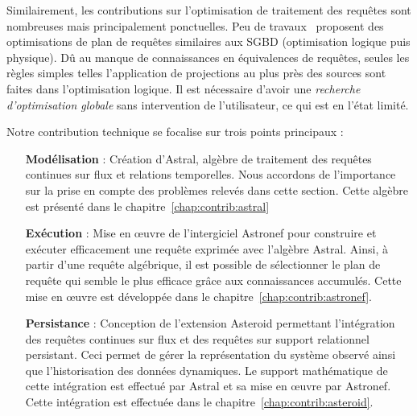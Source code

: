 Similairement, les contributions sur l'optimisation de traitement des requêtes sont nombreuses mais principalement ponctuelles. Peu de travaux~\cite{Galpin:snee,Kramer:semantics} proposent des optimisations de plan de requêtes similaires aux SGBD (optimisation logique puis physique). Dû au manque de connaissances en équivalences de requêtes, seules les règles simples telles l'application de projections au plus près des sources sont faites dans l'optimisation logique. Il est nécessaire d'avoir une \textit{recherche d'optimisation globale} sans intervention de l'utilisateur, ce qui est en l'état limité. 

Notre contribution technique se focalise sur trois points principaux :
\begin{itemize}
 \item[\textbf{Modélisation}] : Création d'Astral, algèbre de traitement des requêtes continues sur flux et relations temporelles. Nous accordons de l'importance sur la prise en compte des problèmes relevés dans cette section. Cette algèbre est présenté dans le chapitre~\ref{chap:contrib:astral}
 \item[\textbf{Exécution}] : Mise en œuvre de l'intergiciel Astronef pour construire et exécuter efficacement une requête exprimée avec l'algèbre Astral. Ainsi, à partir d'une requête algébrique, il est possible de sélectionner le plan de requête qui semble le plus efficace grâce aux connaissances accumulés. Cette mise en œuvre est développée dans le chapitre~\ref{chap:contrib:astronef}.
 \item[\textbf{Persistance}] : Conception de l'extension Asteroid permettant l'intégration des requêtes continues sur flux et des requêtes sur support relationnel persistant. Ceci permet de gérer la représentation du système observé ainsi que l'historisation des données dynamiques. Le support mathématique de cette intégration est effectué par Astral et sa mise en œuvre par Astronef. Cette intégration est effectuée dans le chapitre~\ref{chap:contrib:asteroid}.
\end{itemize}

